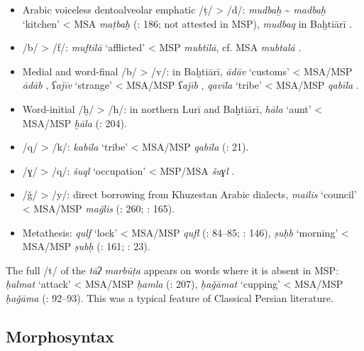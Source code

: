 \documentclass[output=paper]{langsci/langscibook}
\begin{document}
\begin{itemize}
\item[]
Arabic voiceless dentoalveolar emphatic /ṭ/ > /d/: \textit{mudbaḫ} \~{} \textit{madbaḫ} ‘kitchen’ < MSA \textit{maṭbaḫ} (\citealt{Ṣarrāfī1996}: 186; not attested in MSP), \textit{mudbaq} in Baḫtiārī \citep[251]{Sarlak2002}.

\item[]
/b/ > /f/: \emph{muftilā} ‘afflicted’ < MSP \textit{mubtilā}, cf. MSA  \textit{mubtalā} \citep{Borjian2017}.

\item[]
Medial and word-final /b/ > /v/: in Baḫtiārī, \textit{ādāv} ‘customs’ < MSA/MSP \textit{ādāb} \citep[15]{Sarlak2002}, \textit{ʕajīv} ‘strange’ < MSA/MSP \textit{ʕajīb} \citep[25]{Sarlak2002}, \textit{qavīla} ‘tribe’ < MSA/MSP \textit{qabīla} \citep[199]{Sarlak2002}.

\item[]
Word-initial /ḫ/ > /h/: in northern Lurī and Baḫtiārī, \textit{hāla} ‘aunt’ < MSA/MSP \textit{ḫāla} (\citealt{Īzadpanāh2001}: 204).

\item
/q/ > /k/: \textit{kabīla} ‘tribe’ < MSA/MSP \textit{qabīla} (\citealt{NaǧībiFīni2002}: 21).

\item[]
/ɣ/ > /q/: \textit{šuql} ‘occupation’ < MSP/MSA \textit{šuɣl} \citep{Stilo2001}.

\item[]
/ǧ/ > /y/: direct borrowing from Khuzestan Arabic dialects, \textit{mailis} ‘council’ < MSA/MSP \textit{maǧlis} (\citealt{Sarlak2002}: 260; \citealt{Fāẓilī2004}: 165).

\item[]
Metathesis: \textit{qulf} ‘lock’ < MSA/MSP \textit{qufl} (\citealt{Salāmī2004}: 84–85; \citealt{ImāmAhwāzī2000}: 146), \textit{ṣuḥb} ‘morning’ < MSA/MSP \textit{ṣubḥ} (\citealt{Dānišgar1995}: 161; \citealt{NaǧībiFīni2002}: 23).
\end{itemize}

The full /t/ of the \textit{tāʔ} \textit{marbūṭa} appears on words where it is absent in MSP: \textit{ḥalmat} ‘attack’ < MSA/MSP \textit{ḥamla} (\citealt{Īzadpanāh2001}: 207), \textit{ḥaǧāmat} ‘cupping’ < MSA/MSP \textit{ḥaǧāma} (\citealt{Salāmī2004}: 92–93). This was a typical feature of Classical Persian literature.

\subsection{Morphosyntax}
\end{document}
